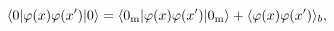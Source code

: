 \begin{equation}
\langle 0|\varphi (x)\varphi (x^{\prime })|0\rangle =\langle 0_{{\rm m}%
}|\varphi (x)\varphi (x^{\prime })|0_{{\rm m}}\rangle +\langle
\varphi (x)\varphi (x^{\prime })\rangle _{b},  \label{unregWight1}
\end{equation}

